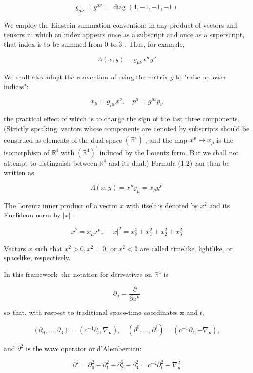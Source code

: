 \documentclass[10pt, letterpaper]{article}
\begin{document}
$$
g_{\mu \nu}=g^{\mu \nu}=\operatorname{diag}(1,-1,-1,-1)
$$

We employ the Einstein summation convention: in any product of vectors and tensors in which an index appears once as a subscript and once as a superscript, that index is to be summed from 0 to 3 . Thus, for example,

$$
\Lambda(x, y)=g_{\mu \nu} x^{\mu} y^{\nu}
$$

We shall also adopt the convention of using the matrix $g$ to "raise or lower indices":

$$
x_{\mu}=g_{\mu \nu} x^{\nu}, \quad p^{\mu}=g^{\mu \nu} p_{\nu}
$$

the practical effect of which is to change the sign of the last three components. (Strictly speaking, vectors whose components are denoted by subscripts should be construed as elements of the dual space $\left(\mathbb{R}^{4}\right)^{\prime}$, and the map $x^{\mu} \mapsto x_{\mu}$ is the isomorphism of $\mathbb{R}^{4}$ with $\left(\mathbb{R}^{4}\right)^{\prime}$ induced by the Lorentz form. But we shall not attempt to distinguish between $\mathbb{R}^{4}$ and its dual.) Formula (1.2) can then be written as

$$
\Lambda(x, y)=x^{\mu} y_{\mu}=x_{\mu} y^{\mu}
$$

The Lorentz inner product of a vector $x$ with itself is denoted by $x^{2}$ and its Euclidean norm by $|x|$ :

$$
x^{2}=x_{\mu} x^{\mu}, \quad|x|^{2}=x_{0}^{2}+x_{1}^{2}+x_{2}^{2}+x_{3}^{2}
$$

Vectors $x$ such that $x^{2}>0, x^{2}=0$, or $x^{2}<0$ are called timelike, lightlike, or spacelike, respectively.

In this framework, the notation for derivatives on $\mathbb{R}^{4}$ is

$$
\partial_{\mu}=\frac{\partial}{\partial x^{\mu}}
$$

so that, with respect to traditional space-time coordinates $\mathbf{x}$ and $t$,

$$
\left(\partial_{0}, \ldots, \partial_{3}\right)=\left(c^{-1} \partial_{t}, \nabla_{\mathbf{x}}\right), \quad\left(\partial^{0}, \ldots, \partial^{3}\right)=\left(c^{-1} \partial_{t},-\nabla_{\mathbf{x}}\right),
$$

and $\partial^{2}$ is the wave operator or d'Alembertian:

$$
\partial^{2}=\partial_{0}^{2}-\partial_{1}^{2}-\partial_{2}^{2}-\partial_{3}^{2}=c^{-2} \partial_{t}^{2}-\nabla_{\mathbf{x}}^{2}
$$
\end{document}
